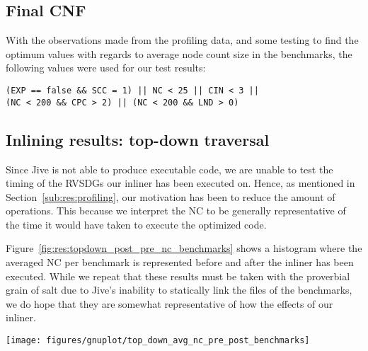 \subsection{Final CNF}
\label{sub:res:final_cnf}

With the observations made from the profiling data, and some testing to find the
optimum values with regards to average node count size in the benchmarks, the
following values were used for our test results:

\begin{centering}
\lstinline!(EXP == false && SCC = 1) || NC < 25 || CIN < 3 ||! \\
\lstinline!(NC < 200 && CPC > 2) || (NC < 200 && LND > 0)! \\
\end{centering}

\subsection{Inlining results: top-down traversal}
\label{sub:res:inlining_top_down}

Since Jive is not able to produce executable code, we are unable to test the
timing of the RVSDGs our inliner has been executed on. Hence, as mentioned in
Section~\ref{sub:res:profiling}, our motivation has been to reduce the amount of
operations. This because we interpret the NC to be generally representative of
the time it would have taken to execute the optimized code.

Figure~\ref{fig:res:topdown_post_pre_nc_benchmarks} shows a histogram where the
averaged NC per benchmark is represented before and after the inliner has been
executed. While we repeat that these results must be taken with the proverbial
grain of salt due to Jive's inability to statically link the files of the
benchmarks, we do hope that they are somewhat representative of how the effects
of our inliner.

\begin{centering}
	\noindent\begin{minipage}{\textwidth}
		\captionsetup{type=figure}
		\hspace{-1em}
		\texttt{[image: figures/gnuplot/top\_down\_avg\_nc\_pre\_post\_benchmarks]}
	\end{minipage}
	\label{fig:res:topdown_post_pre_nc_benchmarks}
\end{centering}


